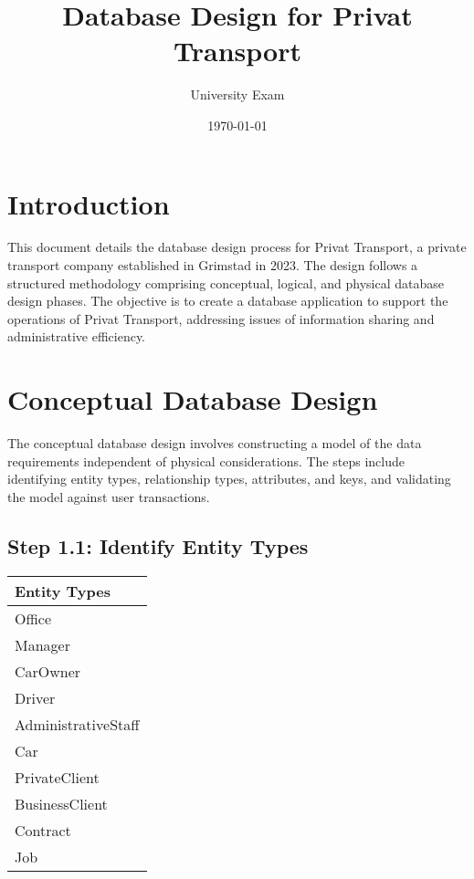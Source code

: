 \documentclass[a4paper,12pt]{article}
\title{Database Design for Privat Transport}
\author{University Exam}
\date{\today}
\begin{document}
\maketitle

\section*{Introduction}
This document details the database design process for Privat Transport, a private transport company established in Grimstad in 2023. The design follows a structured methodology comprising conceptual, logical, and physical database design phases. The objective is to create a database application to support the operations of Privat Transport, addressing issues of information sharing and administrative efficiency.

\section*{Conceptual Database Design}
The conceptual database design involves constructing a model of the data requirements independent of physical considerations. The steps include identifying entity types, relationship types, attributes, and keys, and validating the model against user transactions.

\subsection*{Step 1.1: Identify Entity Types}
\begin{table}[H]
\centering
\begin{tabularx}{\textwidth}{|X|}
\hline
\rowcolor{blue!20} \textbf{Entity Types} \\
\hline
Office \\
\hline
Manager \\
\hline
CarOwner \\
\hline
Driver \\
\hline
AdministrativeStaff \\
\hline
Car \\
\hline
PrivateClient \\
\hline
BusinessClient \\
\hline
Contract \\
\hline
Job \\
\hline
\end{tabularx}
\end{table}
\end{document}
